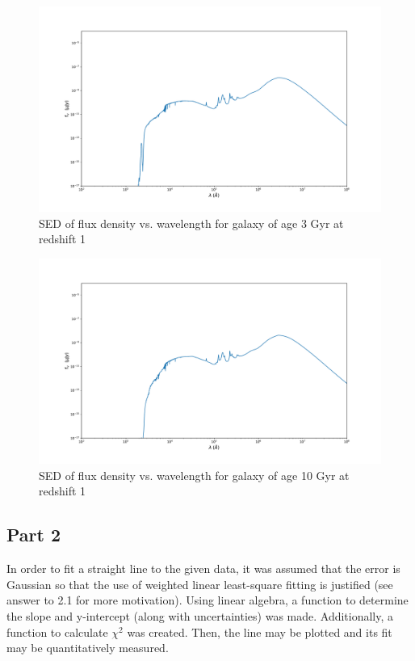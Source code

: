\documentclass{article}
\begin{document}
\begin{figure}[H]
  \centering
\includegraphics[scale=0.25]{SED age 3 redshift 1}
\caption{SED of flux density vs. wavelength for galaxy of age 3 Gyr at redshift 1}
\end{figure}

\begin{figure}[H]
  \centering
\includegraphics[scale=0.25]{SED age 10 redshift 1}
\caption{SED of flux density vs. wavelength for galaxy of age 10 Gyr at redshift 1}
\end{figure}

\subsection*{Part 2}

In order to fit a straight line to the given data, it was assumed that the error is Gaussian
so that the use of weighted linear least-square fitting is justified (see answer to 2.1 for more motivation). Using linear
algebra, a function to determine the slope and y-intercept (along with uncertainties) was made.
Additionally, a function to calculate $\chi ^2$ was created. Then, the line may be plotted and
its fit may be quantitatively measured.
\end{document}
